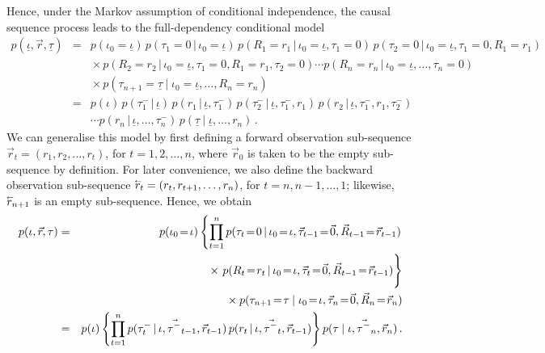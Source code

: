 \documentclass[a4paper]{article}
\newcommand{\rvec}[1]{\accentset{\leftarrow}{#1}}
\newcommand{\ui}{\underline{\iota}}
\newcommand{\ut}{\underline{\tau}}
\begin{document}
Hence, under the Markov assumption of conditional independence,
the causal sequence process leads to the full-dependency conditional model
\begin{eqnarray}
p(\ui,\vec{r},\ut) & = &
p(\iota_0\!=\!\ui)
\,p(\tau_1\!=\!0\,|\,\iota_0\!=\!\ui)
\,p(R_1\!=\!r_1\,|\,\iota_0\!=\!\ui,\tau_1\!=\!0)
\,p(\tau_2\!=\!0\,|\,\iota_0\!=\!\ui,\tau_1\!=\!0,R_1\!=\!r_1)
\nonumber\\&&
{}\times p(R_2\!=\!r_2\,|\,\iota_0\!=\!\ui,\tau_1\!=\!0,R_1\!=\!r_1,\tau_2\!=\!0)
\cdots
p(R_n\!=\!r_n\,|\,\iota_0\!=\!\ui,\ldots,\tau_{n}\!=\!0)
\nonumber\\&&
{}\times p(\tau_{n+1}\!=\!\ut\:|\;\iota_0\!=\!\ui,\ldots,R_n\!=\!r_n)
\nonumber\\
& = &
p({\iota})
\,p(\tau^-_1\,|\,\ui)
\,p(r_1\,|\,\ui,\tau^-_1)
\,p(\tau^-_2\,|\,\ui,\tau^-_1,r_1)
\, p(r_2\,|\,\ui,\tau^-_1,r_1,\tau^-_2)
\nonumber\\
&&
\cdots
p(r_n\,|\,\ui,\ldots,\tau^-_{n})
\, p(\ut\:|\;\ui,\ldots,r_n)
\,.
\label{eq:temporal-model-full}
\end{eqnarray}
We can generalise this model by first defining a forward observation sub-sequence $\vec{r}_t=(r_1,r_2,\ldots,r_t)$,
for $t=1,2,\ldots,n$, where $\vec{r}_0$ is taken to be the empty sub-sequence by definition.
 For later convenience, we also define the backward observation sub-sequence $\rvec{r}_t=(r_t,r_{t+1},\ldots,r_n)$,
for $t=n,n-1,\ldots,1$; likewise, $\rvec{r}_{n+1}$ is an empty sub-sequence.
Hence, we obtain
\begin{eqnarray}
p({\iota},\vec{r},{\tau}) & = &
p(\iota_0\!=\!{\iota})
\left\{\prod_{t=1}^{n}p(\tau_t\!=\!0\,|\,\iota_0\!=\!{\iota},\vec{\tau}_{t-1}\!=\!\vec{0},
\vec{R}_{t-1}\!=\!\vec{r}_{t-1})\right.
\nonumber\\&&
\hspace*{20mm}{}\times \left.\rule{0pt}{6mm}
p(R_t\!=\!r_t\,|\,\iota_0\!=\!{\iota},\vec{\tau}_t\!=\!\vec{0},\vec{R}_{t-1}\!=\!\vec{r}_{t-1})\right\}
\nonumber\\&&
{}\times p(\tau_{n+1}\!=\!{\tau}\:|\;\iota_0\!=\!{\iota},\vec{\tau}_n\!=\!\vec{0},\vec{R}_n\!=\!\vec{r}_n)
\nonumber\\
& = &
p({\iota})
\left\{\prod_{t=1}^{n}p(\tau^-_t\,|\,{\iota},\vec{\tau^-}_{t-1},\vec{r}_{t-1})
\,p(r_t\,|\,{\iota},\vec{\tau^-}_t,\vec{r}_{t-1})\right\}
 p({\tau}\:|\;{\iota},\vec{\tau^-}_n,\vec{r}_n)
\,.
\label{eq:temporal-model}
\end{eqnarray}
\end{document}
